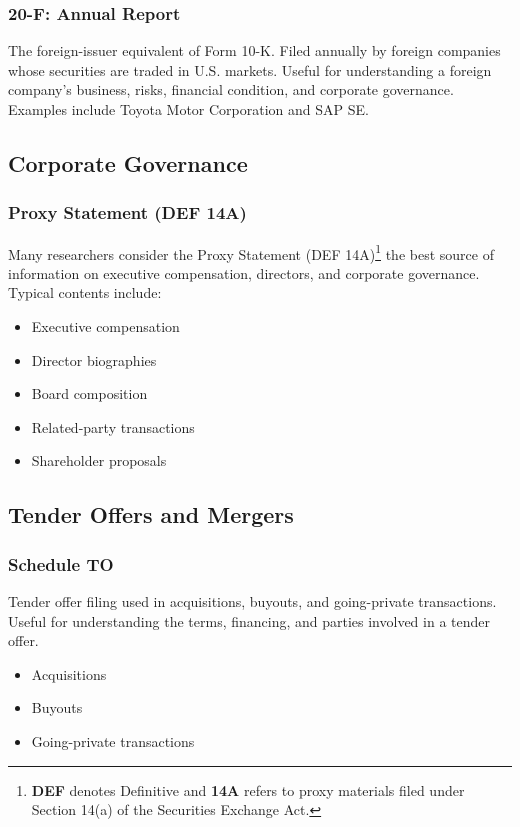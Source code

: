 \documentclass[11pt,a4paper]{report}
\begin{document}
\subsubsection{20-F: Annual Report}
The foreign-issuer equivalent of Form 10-K. Filed annually by foreign companies whose securities are traded in U.S. markets. Useful for understanding a foreign company’s business, risks, financial condition, and corporate governance. Examples include Toyota Motor Corporation and SAP SE.

\subsection{Corporate Governance}
\subsubsection{Proxy Statement (DEF 14A)}
Many researchers consider the Proxy Statement (DEF 14A)\footnote{\textbf{DEF} denotes Definitive and \textbf{14A} refers to proxy materials filed under Section 14(a) of the Securities Exchange Act.} the best source of information on executive compensation, directors, and corporate governance. Typical contents include:
\begin{itemize}
\item Executive compensation
\item Director biographies
\item Board composition
\item Related-party transactions
\item Shareholder proposals
\end{itemize}


\subsection{Tender Offers and Mergers}
\subsubsection{Schedule TO}
Tender offer filing used in acquisitions, buyouts, and going-private transactions. Useful for understanding the terms, financing, and parties involved in a tender offer.
\begin{itemize}
\item Acquisitions
\item Buyouts
\item Going-private transactions
\end{itemize}
\end{document}

